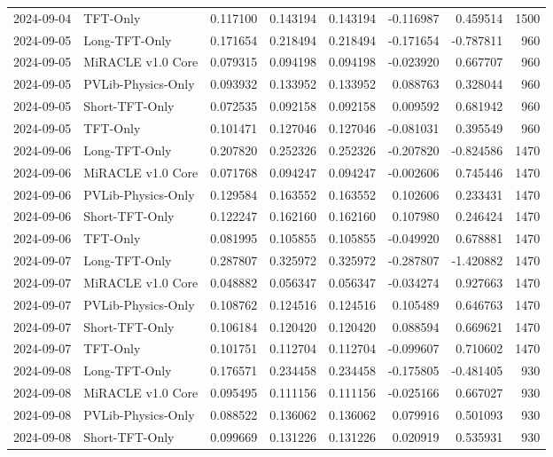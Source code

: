 \begin{tabular}{llrrrrrr}
2024-09-04 & TFT-Only & 0.117100 & 0.143194 & 0.143194 & -0.116987 & 0.459514 & 1500 \\
2024-09-05 & Long-TFT-Only & 0.171654 & 0.218494 & 0.218494 & -0.171654 & -0.787811 & 960 \\
2024-09-05 & MiRACLE v1.0 Core & 0.079315 & 0.094198 & 0.094198 & -0.023920 & 0.667707 & 960 \\
2024-09-05 & PVLib-Physics-Only & 0.093932 & 0.133952 & 0.133952 & 0.088763 & 0.328044 & 960 \\
2024-09-05 & Short-TFT-Only & 0.072535 & 0.092158 & 0.092158 & 0.009592 & 0.681942 & 960 \\
2024-09-05 & TFT-Only & 0.101471 & 0.127046 & 0.127046 & -0.081031 & 0.395549 & 960 \\
2024-09-06 & Long-TFT-Only & 0.207820 & 0.252326 & 0.252326 & -0.207820 & -0.824586 & 1470 \\
2024-09-06 & MiRACLE v1.0 Core & 0.071768 & 0.094247 & 0.094247 & -0.002606 & 0.745446 & 1470 \\
2024-09-06 & PVLib-Physics-Only & 0.129584 & 0.163552 & 0.163552 & 0.102606 & 0.233431 & 1470 \\
2024-09-06 & Short-TFT-Only & 0.122247 & 0.162160 & 0.162160 & 0.107980 & 0.246424 & 1470 \\
2024-09-06 & TFT-Only & 0.081995 & 0.105855 & 0.105855 & -0.049920 & 0.678881 & 1470 \\
2024-09-07 & Long-TFT-Only & 0.287807 & 0.325972 & 0.325972 & -0.287807 & -1.420882 & 1470 \\
2024-09-07 & MiRACLE v1.0 Core & 0.048882 & 0.056347 & 0.056347 & -0.034274 & 0.927663 & 1470 \\
2024-09-07 & PVLib-Physics-Only & 0.108762 & 0.124516 & 0.124516 & 0.105489 & 0.646763 & 1470 \\
2024-09-07 & Short-TFT-Only & 0.106184 & 0.120420 & 0.120420 & 0.088594 & 0.669621 & 1470 \\
2024-09-07 & TFT-Only & 0.101751 & 0.112704 & 0.112704 & -0.099607 & 0.710602 & 1470 \\
2024-09-08 & Long-TFT-Only & 0.176571 & 0.234458 & 0.234458 & -0.175805 & -0.481405 & 930 \\
2024-09-08 & MiRACLE v1.0 Core & 0.095495 & 0.111156 & 0.111156 & -0.025166 & 0.667027 & 930 \\
2024-09-08 & PVLib-Physics-Only & 0.088522 & 0.136062 & 0.136062 & 0.079916 & 0.501093 & 930 \\
2024-09-08 & Short-TFT-Only & 0.099669 & 0.131226 & 0.131226 & 0.020919 & 0.535931 & 930 \\

\end{tabular}
